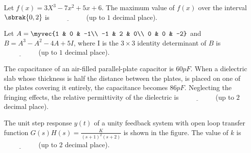 \iffalse
\chapter{2018}
\author{AI24BTECH11027}
\section{ee}
\fi

\item Let $f(x)=3X^3-7x^2+5x+6.$ The maximum value of $f(x)$ over the interval $\sbrak{0,2}$ is $\underline{\hspace{2cm}}$ (up to $1$ decimal place).\\

\item Let $A=\myvec{1 & 0 & -1\\ -1 & 2 & 0\\ 0 & 0 & -2}$ and $B=A^3-A^2-4A+5I$, where I is the $3\times3$ identity determinant of $B$ is $\underline{\hspace{2cm}}$ (up to $1$ decimal place).\\

\item The capacitance of an air-filled parallel-plate capacitor is $60 pF.$ When a dielectric slab whose thickness is half the distance between the plates, is placed on one of the plates covering it entirely, the capacitance becomes $86 pF.$ Neglecting the fringing effects, the relative permittivity of the dielectric is $\underline{\hspace{2cm}}$  (up to $2$ decimal place).\\ 

\item The unit step response $y(t)$ of a unity feedback system with open loop transfer function $G(s)H(s)=\frac{K}{(s+1)^2(s+2)}$ is shown in the figure. The value of $k$ is $\underline{\hspace{2cm}}$  (up to $2$ decimal place).

